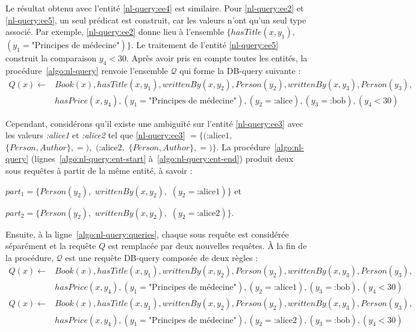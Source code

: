Le résultat obtenu avec l'entité \ref{nl-query:ee4} est similaire.
Pour \ref{nl-query:ee2} et \ref{nl-query:ee5}, un seul prédicat est construit, car les valeurs n'ont qu'un seul type associé.
Par exemple, \ref{nl-query:ee2} donne lieu à l'ensemble $\{ hasTitle(x, y_1),$ $(y_1 = \text{"Principes de médecine"}) \}$.
Le traitement de l'entité \ref{nl-query:ee5} construit la comparaison $y_4 < 30$.
Après avoir pris en compte toutes les entités, la procédure~\ref{algo:nl-query} renvoie l'ensemble $\mathcal{Q}$ qui forme la DB-query suivante :
\begin{equation*}
    \begin{split}
        Q(x) \leftarrow & Book(x), hasTitle(x, y_1), writtenBy(x, y_2), Person(y_2), writtenBy(x, y_3), Person(y_3),                      \\
                        & hasPrice(x, y_4), (y_1 = \text{"Principes de médecine"}), (y_2= \text{:alice}), (y_3 = \text{:bob}), (y_4 < 30)
    \end{split}
\end{equation*}

Cependant, considérons qu'il existe une ambiguïté sur l'entité \ref{nl-query:ee3} avec les valeurs \emph{:alice1} et \emph{:alice2} tel que \ref{nl-query:ee3} $= \{(\text{:alice1},$ $\{Person, Author\}, =),$ $(\text{:alice2},$ $\{Person, Author\}, =)\}$.
La procédure~\ref{algo:nl-query} (lignes~\ref{algo:nl-query:ent-start} à~\ref{algo:nl-query:ent-end}) produit deux sous requêtes à partir de la même entité, à savoir :
\begin{enumerate*}[label=(\roman*)]
    \item $part_1 = \{ Person(y_2),$ $writtenBy(x, y_2),$ $(y_2 = \text{:alice1}) \}$ et
    \item $part_2 = \{ Person(y_2),$ $writtenBy(x, y_2),$ $(y_2 = \text{:alice2}) \}$.
\end{enumerate*}
Ensuite, à la ligne~\ref{algo:nl-query:queries}, chaque sous requête est considérée séparément et la requête $Q$ est remplacée par deux nouvelles requêtes.
À la fin de la procédure, $\mathcal{Q}$ est une requête DB-query composée de deux règles :
\begin{equation*}
    \begin{split}
        Q(x) \leftarrow & Book(x), hasTitle(x, y_1), writtenBy(x, y_2), Person(y_2), writtenBy(x, y_3), Person(y_3),                       \\
                        & hasPrice(x, y_4), (y_1 = \text{"Principes de médecine"}), (y_2= \text{:alice1}), (y_3 = \text{:bob}), (y_4 < 30) \\
        Q(x) \leftarrow & Book(x), hasTitle(x, y_1), writtenBy(x, y_2), Person(y_2), writtenBy(x, y_3), Person(y_3),                       \\
                        & hasPrice(x, y_4), (y_1 = \text{"Principes de médecine"}), (y_2= \text{:alice2}), (y_3 = \text{:bob}), (y_4 < 30)
    \end{split}
\end{equation*}

